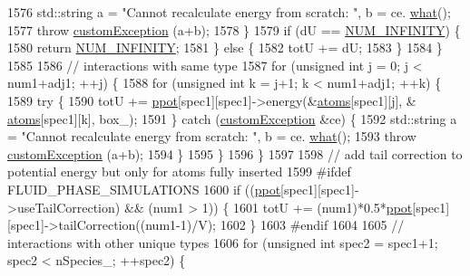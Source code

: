 \begin{DoxyCode}
1576                 std::string a = \textcolor{stringliteral}{"Cannot recalculate energy from scratch: "}, b = ce.
      \hyperlink{classcustom_exception_aeb6ab5848b038adfc68fde86a512f691}{what}();
1577                 \textcolor{keywordflow}{throw} \hyperlink{classcustom_exception}{customException} (a+b);
1578             \}
1579             \textcolor{keywordflow}{if} (dU == \hyperlink{potentials_8h_ab94ab1d09e2291d03fe92a0e24a9d33b}{NUM\_INFINITY}) \{
1580                 \textcolor{keywordflow}{return} \hyperlink{potentials_8h_ab94ab1d09e2291d03fe92a0e24a9d33b}{NUM\_INFINITY};
1581             \} \textcolor{keywordflow}{else} \{
1582                 totU += dU;
1583             \}
1584         \}
1585 
1586         \textcolor{comment}{// interactions with same type}
1587         \textcolor{keywordflow}{for} (\textcolor{keywordtype}{unsigned} \textcolor{keywordtype}{int} j = 0; j < num1+adj1; ++j) \{
1588             \textcolor{keywordflow}{for} (\textcolor{keywordtype}{unsigned} \textcolor{keywordtype}{int} k = j+1; k < num1+adj1; ++k) \{
1589                 \textcolor{keywordflow}{try} \{
1590                     totU += \hyperlink{classsim_system_ad2e290b5963f132e6a3a56cee35c8e9f}{ppot}[spec1][spec1]->energy(&\hyperlink{classsim_system_a90421b19082f7fb8fc23b7264b1161e4}{atoms}[spec1][j], &
      \hyperlink{classsim_system_a90421b19082f7fb8fc23b7264b1161e4}{atoms}[spec1][k], box\_);
1591                 \} \textcolor{keywordflow}{catch} (\hyperlink{classcustom_exception}{customException} &ce) \{
1592                     std::string a = \textcolor{stringliteral}{"Cannot recalculate energy from scratch: "}, b = ce.
      \hyperlink{classcustom_exception_aeb6ab5848b038adfc68fde86a512f691}{what}();
1593                     \textcolor{keywordflow}{throw} \hyperlink{classcustom_exception}{customException} (a+b);
1594                 \}
1595             \}
1596         \}
1597 
1598         \textcolor{comment}{// add tail correction to potential energy but only for atoms fully inserted}
1599 \textcolor{preprocessor}{#ifdef FLUID\_PHASE\_SIMULATIONS}
1600 \textcolor{preprocessor}{}        \textcolor{keywordflow}{if} ((\hyperlink{classsim_system_ad2e290b5963f132e6a3a56cee35c8e9f}{ppot}[spec1][spec1]->useTailCorrection) && (num1 > 1)) \{
1601             totU += (num1)*0.5*\hyperlink{classsim_system_ad2e290b5963f132e6a3a56cee35c8e9f}{ppot}[spec1][spec1]->tailCorrection((num1-1)/V);
1602         \}
1603 \textcolor{preprocessor}{#endif}
1604 \textcolor{preprocessor}{}
1605         \textcolor{comment}{// interactions with other unique types}
1606         \textcolor{keywordflow}{for} (\textcolor{keywordtype}{unsigned} \textcolor{keywordtype}{int} spec2 = spec1+1; spec2 < nSpecies\_; ++spec2) \{

\end{DoxyCode}
